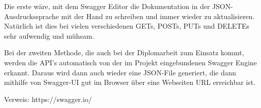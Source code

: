 Die erste wäre, mit dem Swagger Editor die Dokumentation in der JSON-Ausdruckssprache mit der Hand zu schreiben und immer wieder zu aktualisieren. Natürlich ist dies bei vielen verschiedenen GETs, POSTs, PUTs und DELETEs sehr aufwendig und mühsam.

Bei der zweiten Methode, die auch bei der Diplomarbeit zum Einsatz kommt, werden die API's automatisch von der im Projekt eingebundenen Swagger Engine erkannt. Daraus wird dann auch wieder eine JSON-File generiert, die dann mithilfe von Swagger-UI gut im Browser über eine Webseiten URL erreichbar ist.


Verweis: https://swagger.io/